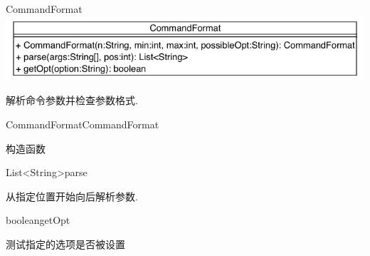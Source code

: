\begin{XeClass}{CommandFormat}
\includegraphics[width=\textwidth]{cdig/CommandFormat.png}
     
 解析命令参数并检查参数格式.

    \begin{XeMethod}{\XePublic}{CommandFormat}{CommandFormat}
         
 构造函数

    \end{XeMethod}

    \begin{XeMethod}{\XePublic}{List<String>}{parse}
         
 从指定位置开始向后解析参数.

    \end{XeMethod}

    \begin{XeMethod}{\XePublic}{boolean}{getOpt}
         
 测试指定的选项是否被设置

    \end{XeMethod}

\end{XeClass}
